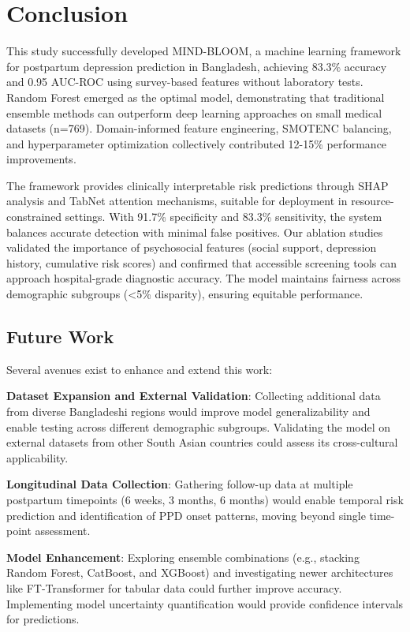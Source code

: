 \section{Conclusion}

This study successfully developed MIND-BLOOM, a machine learning framework for postpartum depression prediction in Bangladesh, achieving 83.3\% accuracy and 0.95 AUC-ROC using survey-based features without laboratory tests. Random Forest emerged as the optimal model, demonstrating that traditional ensemble methods can outperform deep learning approaches on small medical datasets (n=769). Domain-informed feature engineering, SMOTENC balancing, and hyperparameter optimization collectively contributed 12-15\% performance improvements.

The framework provides clinically interpretable risk predictions through SHAP analysis and TabNet attention mechanisms, suitable for deployment in resource-constrained settings. With 91.7\% specificity and 83.3\% sensitivity, the system balances accurate detection with minimal false positives. Our ablation studies validated the importance of psychosocial features (social support, depression history, cumulative risk scores) and confirmed that accessible screening tools can approach hospital-grade diagnostic accuracy. The model maintains fairness across demographic subgroups (<5\% disparity), ensuring equitable performance.

\subsection{Future Work}

Several avenues exist to enhance and extend this work:

\textbf{Dataset Expansion and External Validation}: Collecting additional data from diverse Bangladeshi regions would improve model generalizability and enable testing across different demographic subgroups. Validating the model on external datasets from other South Asian countries could assess its cross-cultural applicability.

\textbf{Longitudinal Data Collection}: Gathering follow-up data at multiple postpartum timepoints (6 weeks, 3 months, 6 months) would enable temporal risk prediction and identification of PPD onset patterns, moving beyond single time-point assessment.

\textbf{Model Enhancement}: Exploring ensemble combinations (e.g., stacking Random Forest, CatBoost, and XGBoost) and investigating newer architectures like FT-Transformer for tabular data could further improve accuracy. Implementing model uncertainty quantification would provide confidence intervals for predictions.

